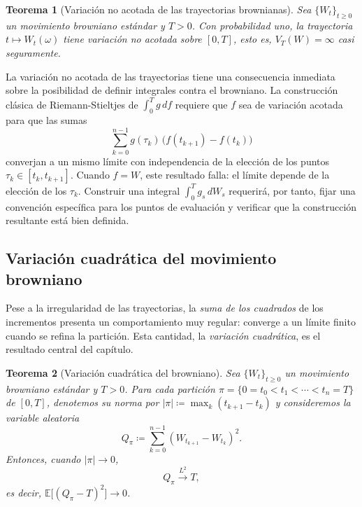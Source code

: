 \documentclass[11pt,a4paper,oneside]{report}
\theoremstyle{plain}
\newtheorem{teorema}{Teorema}[chapter]
\theoremstyle{definition}
\theoremstyle{remark}
\newcommand{\E}{\mathbb{E}}
\newcommand{\1}{\mathbf{1}}
\newcommand{\eqdef}{\coloneqq}
\begin{document}
\begin{teorema}[Variación no acotada de las trayectorias brownianas]
\label{teo:variacion_no_acotada}
Sea $\{W_t\}_{t \geq 0}$ un movimiento browniano estándar y $T > 0$.
Con probabilidad uno, la trayectoria $t \mapsto W_t(\omega)$ tiene
variación no acotada sobre $[0, T]$, esto es, $V_T(W) = \infty$ casi
seguramente.
\end{teorema}

La
variación no acotada de las trayectorias tiene una consecuencia
inmediata sobre la posibilidad de definir integrales contra el
browniano. La construcción clásica de Riemann-Stieltjes de $\int_0^T
g\, df$ requiere que $f$ sea de variación acotada para que las sumas
\begin{equation*}
  \sum_{k=0}^{n-1} g(\tau_k)\, \bigl(f(t_{k+1}) - f(t_k)\bigr)
\end{equation*}
converjan a un mismo límite con independencia de la elección de los
puntos $\tau_k \in [t_k, t_{k+1}]$. Cuando $f = W$, este resultado
falla: el límite depende de la elección de los $\tau_k$. Construir una integral $\int_0^T g_s\, dW_s$ requerirá, por
tanto, fijar una convención específica para los puntos de
evaluación y verificar que la construcción resultante está bien
definida.

\subsection{Variación cuadrática del movimiento browniano}
\label{subsec:variacion_cuadratica}

Pese a la irregularidad de las trayectorias, la \emph{suma de los
cuadrados} de los incrementos presenta un comportamiento muy regular: converge a un límite finito cuando se refina la
partición. Esta cantidad, la \emph{variación cuadrática}, es el
resultado central del capítulo.

\medskip

\begin{teorema}[Variación cuadrática del browniano]
\label{teo:variacion_cuadratica}
Sea $\{W_t\}_{t \geq 0}$ un movimiento browniano estándar y $T > 0$.
Para cada partición $\pi = \{0 = t_0 < t_1 < \cdots < t_n = T\}$ de
$[0, T]$, denotemos su norma por $|\pi| \eqdef \max_{k} (t_{k+1} -
t_k)$ y consideremos la variable aleatoria
\begin{equation*}
  Q_\pi \eqdef \sum_{k=0}^{n-1} (W_{t_{k+1}} - W_{t_k})^2.
\end{equation*}
Entonces, cuando $|\pi| \to 0$,
\begin{equation}\label{eq:convergencia_var_cuadratica}
  Q_\pi \xrightarrow{L^2} T,
\end{equation}
es decir, $\E\bigl[(Q_\pi - T)^2\bigr] \to 0$.
\end{teorema}
\end{document}
